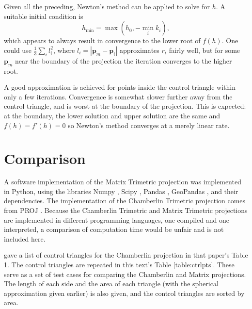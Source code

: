 \documentclass[]{interact}
\begin{document}
Given all the preceding, Newton's method can be applied to solve for $h$.
A suitable initial condition is
\begin{equation}\label{eq:inverseh}
  h_{\min} = \max \left(h_0, -\min_i k_i \right),
\end{equation}
which appears to always result in convergence to the lower root of $f(h)$. One
could use $\frac{1}{3}\sum_i l^2_i$, where $l_i = |\mathbf p_m - \mathbf p_i|$
approximates $r_i$ fairly well, but for some $\mathbf p_m$ near the boundary
of the projection the iteration converges to the higher root.

A good approximation is achieved for points inside the control triangle within
only a few iterations. Convergence is somewhat slower further away from the
control triangle, and is worst at the boundary of the projection. This is
expected: at the boundary,
the lower solution and upper solution are the same and $f(h)=f'(h)=0$
so Newton's method converges at a merely linear rate. \citep{burden}

\section{Comparison}
A software implementation of the Matrix Trimetric projection was implemented in
Python, using the libraries Numpy \citep{numpy}, Scipy \citep{scipy}, Pandas
\citep{pandas}, GeoPandas \citep{geopandas}, and their dependencies. The
implementation of the Chamberlin Trimetric projection comes from PROJ
\citeyear{proj}. %
Because the Chamberlin Trimetric and Matrix Trimetric projections are
implemented in different programming languages,
one compiled and one interpreted,
a comparison of computation time would be unfair and is not included here.

\citet{christensen} gave a list of control triangles for the Chamberlin
projection in that paper's Table 1. The control triangles are repeated in this
text's Table \ref{table:ctrlpts}. These serve as a set of test cases for
comparing the Chamberlin and Matrix projections. The length of each side and
the area of each triangle (with the spherical approximation given earlier)
is also given, and the control triangles are sorted by area.
\end{document}
